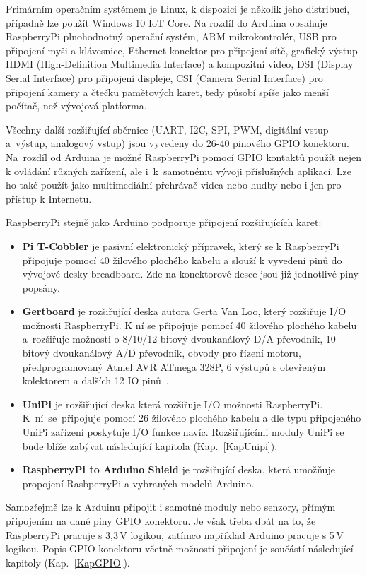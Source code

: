 Primárním operačním systémem je Linux, k dispozici je několik jeho distribucí, případně lze použít Windows 10 IoT Core. Na rozdíl do Arduina obsahuje RaspberryPi plnohodnotný operační systém, ARM mikrokontrolér, USB pro připojení myši a klávesnice, Ethernet konektor pro připojení sítě, grafický výstup HDMI (High-Definition Multimedia Interface) a kompozitní video, DSI (Display Serial Interface) pro připojení displeje, CSI (Camera Serial Interface) pro připojení kamery a čtečku pamětových karet, tedy působí spíše jako menší počítač, než vývojová platforma. 

Všechny další rozšiřující sběrnice (UART, I2C, SPI, PWM, digitální vstup a~výstup, analogový vstup) jsou vyvedeny do 26-40 pinového GPIO konektoru. Na~rozdíl od Arduina je možné RaspberryPi pomocí GPIO kontaktů použít nejen k ovládání různých zařízení, ale i~k~samotnému vývoji příslušných aplikací. Lze ho také použít jako multimediální přehrávač videa nebo hudby nebo i jen pro přístup k Internetu.

RaspberryPi stejně jako Arduino podporuje připojení rozšiřujících karet:

\begin{itemize}
	\item \textbf{Pi T-Cobbler} je pasivní elektronický přípravek, který se k RaspberryPi připojuje pomocí 40 žilového plochého kabelu a slouží k vyvedení pinů do vývojové desky breadboard. Zde na konektorové desce jsou již jednotlivé piny popsány.
\item \textbf{Gertboard} je rozšiřující deska autora Gerta Van Loo, který rozšiřuje I/O možnosti RaspberryPi. K ní se připojuje pomocí 40 žilového plochého kabelu a~rozšiřuje možnosti o 8/10/12-bitový dvoukanálový D/A převodník, 10-bitový dvoukanálový A/D převodník, obvody pro řízení motoru, předprogramovaný Atmel AVR ATmega 328P, 6 výstupů s otevřeným kolektorem a dalších 12 IO pinů~\cite{GertBoard}.  
\item \textbf{UniPi} je rozšiřující deska která rozšiřuje I/O možnosti RaspberryPi. K~ní~se~připojuje pomocí 26 žilového plochého kabelu a dle typu připojeného UniPi zařízení poskytuje I/O funkce navíc. Rozšiřujícími moduly UniPi se bude blíže zabývat následující kapitola (Kap.~\ref{KapUnipi}).
\item \textbf{RaspberryPi to Arduino Shield} je rozšiřující deska, která umožňuje propojení RasbperryPi a vybraných modelů Arduino.
\end{itemize}
Samozřejmě lze k Arduinu připojit i samotné moduly nebo senzory, přímým připojením na dané piny GPIO konektoru. Je však třeba dbát na to, že RaspberryPi pracuje s 3,3\,V logikou, zatímco například Arduino pracuje s 5\,V logikou. Popis GPIO konektoru včetně možností připojení je součástí následující kapitoly (Kap.~\ref{KapGPIO}).


